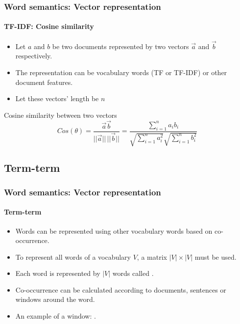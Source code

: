 \documentclass[xcolor=table]{beamer}
\begin{document}
\begin{frame}
\frametitle{Word semantics: Vector representation}
\framesubtitle{TF-IDF: Cosine similarity}

\begin{minipage}{.68\textwidth}
\begin{itemize}
	\item Let $a$ and $b$ be two documents represented by two vectors $\overrightarrow{a}$ and $\overrightarrow{b}$ respectively.
	\item The representation can be vocabulary words (TF or TF-IDF) or other document features.
	\item Let these vectors' length be $n$
\end{itemize}
\end{minipage}
\begin{minipage}{.3\textwidth}
\end{minipage}

\begin{block}{Cosine similarity between two vectors}
	\[
	Cos(\theta) = \frac{\overrightarrow{a} \overrightarrow{b}}{||\overrightarrow{a}||\, ||\overrightarrow{b}||}
	= \frac{\sum_{i=1}^{n} a_i b_i}{\sqrt{\sum_{i=1}^{n} a_i^2} \sqrt{\sum_{i=1}^{n} b_i^2}}
	\]
\end{block}

\end{frame}

\subsection{Term-term}

\begin{frame}
\frametitle{Word semantics: Vector representation}
\framesubtitle{Term-term}

\begin{itemize}
	\item Words can be represented using other vocabulary words based on co-occurrence.
	\item To represent all words of a vocabulary $ V $, a matrix $|V| \times |V|$ must be used.
	\item Each word is represented by $|V|$ words called .
	\item Co-occurrence can be calculated according to documents, sentences or windows around the word.
	\item An example of a window: .
\end{itemize}

\end{frame}
\end{document}
